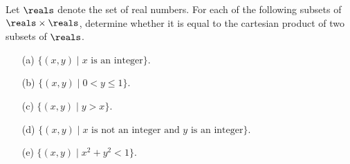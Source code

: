 \begin{exercise}
	Let $\reals$ denote the set of real numbers. For each of the 
	following subsets of $\reals \times \reals$, determine whether 
	it is equal to the cartesian product of two subsets of $\reals$.
	\begin{enumerate}
		\item[(a)] $\{ (x,y) \mid x \text{ is an integer} \}$.
		
		\item[(b)] $\{ (x,y) \mid 0 < y \leq 1 \}$.
		
		\item[(c)] $\{ (x,y) \mid y > x \}$.
		
		\item[(d)] $\{ (x,y) \mid x \text{ is not an integer and } 
			y \text{ is an integer} \}$.
			
		\item[(e)] $\{ (x,y) \mid x^2 + y^2 < 1 \}$.
	\end{enumerate}
\end{exercise}

























